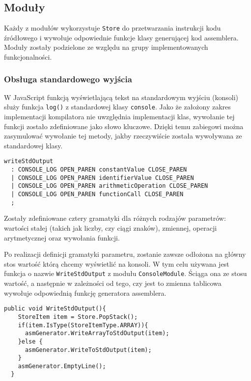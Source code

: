 \subsection{Moduły}

Każdy z modułów wykorzystuje \texttt{Store} do przetwarzania instrukcji kodu źródłowego i wywołuje odpowiednie funkcje klasy generującej kod assemblera. Moduły zostały podzielone ze względu na grupy implementowanych funkcjonalności.

\subsubsection{Obsługa standardowego wyjścia}

W JavaScript funkcją wyświetlającą tekst na standardowym wyjściu (konsoli) służy funkcja \texttt{log()} z standardowej klasy \texttt{console}. Jako że założony zakres implementacji kompilatora nie uwzględnia implementacji klas, wywołanie tej funkcji zostało zdefiniowane jako słowo kluczowe. Dzięki temu zabiegowi można zasymulować wywołanie tej metody, jakby rzeczywiście została wywoływana ze standardowej klasy.

\begin{lstlisting}[caption=Definicja gramatyki dla funkcji standardowego wyjścia, label=alg:consolelogGram]
  writeStdOutput
  : CONSOLE_LOG OPEN_PAREN constantValue CLOSE_PAREN
  | CONSOLE_LOG OPEN_PAREN identifierValue CLOSE_PAREN
  | CONSOLE_LOG OPEN_PAREN arithmeticOperation CLOSE_PAREN
  | CONSOLE_LOG OPEN_PAREN functionCall CLOSE_PAREN
  ;
\end{lstlisting}

\par Zostały zdefiniowane cztery gramatyki dla różnych rodzajów parametrów: wartości stałej (takich jak liczby, czy ciągi znaków), zmiennej, operacji arytmetycznej oraz wywołania funkcji.

\par Po realizacji definicji gramatyki parametru, zostanie zawsze odłożona na główny stos wartość którą chcemy wyświetlić na konsoli. W tym celu używana jest funkcja o nazwie \texttt{WriteStdOutput} z modułu \texttt{ConsoleModule}. Ściąga ona ze stosu wartość, a następnie w zależności od tego, czy jest to zmienna tablicowa wywołuje odpowiednią funkcję generatora assemblera.

\begin{lstlisting}[language=CSharp, caption=Definicja gramatyki dla funkcji standardowego wyjścia, label=alg:consolelogMdoule]
  public void WriteStdOutput(){
    StoreItem item = Store.PopStack();
    if(item.IsType(StoreItemType.ARRAY)){
      asmGenerator.WriteArrayToStdOutput(item);
    }else {
      asmGenerator.WriteToStdOutput(item);
    }
    asmGenerator.EmptyLine();
  }
\end{lstlisting}

